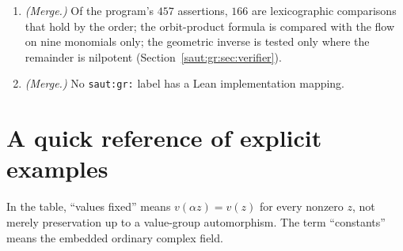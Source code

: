 \documentclass[11pt]{article}
\theoremstyle{definition}
\theoremstyle{remark}
\newcommand{\lbl}[1]{\nolinkurl{#1}}%
\numberwithin{equation}{section}
\begin{document}
\begin{enumerate}[label=\arabic*.,leftmargin=2.2em]
example showing that clause (vi) needs it is the merge's; the credits to
\lbl{osq:thm:universal}, \lbl{odg:thm:transfer}, \lbl{odg:thm:finitequotients} and
\lbl{dsn:thm:finite-quotients} are the merge's.
\item \emph{(Merge.)} Of the program's $457$ assertions, $166$ are lexicographic comparisons
that hold by the order; the orbit-product formula is compared with the flow on nine
monomials only; the geometric inverse is tested only where the remainder is nilpotent
(Section~\ref{saut:gr:sec:verifier}).
\item \emph{(Merge.)} No \texttt{saut:gr:} label has a Lean implementation mapping.
\end{enumerate}

\clearpage
\appendix
\section{A quick reference of explicit examples}\label{saut:sec:examplesummary}

In the table, ``values fixed'' means $v(\alpha z)=v(z)$ for every nonzero
$z$, not merely preservation up to a value-group automorphism.
The term ``constants'' means the embedded ordinary complex field.
\end{document}
